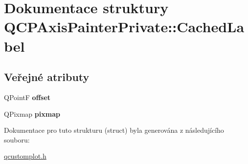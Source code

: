 \hypertarget{structQCPAxisPainterPrivate_1_1CachedLabel}{}\section{Dokumentace struktury Q\+C\+P\+Axis\+Painter\+Private\+:\+:Cached\+Label}
\label{structQCPAxisPainterPrivate_1_1CachedLabel}
\subsection*{Veřejné atributy}
\begin{DoxyCompactItemize}
\item 
\hypertarget{structQCPAxisPainterPrivate_1_1CachedLabel_a5f502db71c92e572f1e6f44f62c59d8e}{}Q\+Point\+F {\bfseries offset}\label{structQCPAxisPainterPrivate_1_1CachedLabel_a5f502db71c92e572f1e6f44f62c59d8e}

\item 
\hypertarget{structQCPAxisPainterPrivate_1_1CachedLabel_a461597cbd470914a9d24b64d16037a88}{}Q\+Pixmap {\bfseries pixmap}\label{structQCPAxisPainterPrivate_1_1CachedLabel_a461597cbd470914a9d24b64d16037a88}

\end{DoxyCompactItemize}


Dokumentace pro tuto strukturu (struct) byla generována z následujícího souboru\+:\begin{DoxyCompactItemize}
\item 
\hyperlink{qcustomplot_8h}{qcustomplot.\+h}\end{DoxyCompactItemize}
